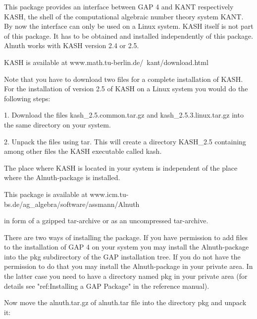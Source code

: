 

This package provides an interface between GAP 4 and KANT respectively
KASH, the shell of the computational algebraic number theory system KANT. By
now the interface can only be used on a Linux system.  KASH itself is not part
of this package.  It has to be obtained and installed independently of this
package. Alnuth works with KASH version 2.4 or 2.5.

 
KASH is available at
\begintt 
            www.math.tu-berlin.de/~kant/download.html
\endtt
 
Note that you have to download two files for a complete installation
of KASH. For the installation of version 2.5 of KASH on a Linux
system you would do the following steps:
\beginlist
\item{1.} Download the files
    kash_2.5.common.tar.gz and kash_2.5.3.linux.tar.gz
    into the same directory on your system.
 
\item{2.} Unpack the files using tar.  This will create a directory
    KASH_2.5 containing among other files the KASH executable called
    kash.

\endlist

The place where KASH is located in your system is independent of the place
 where the Alnuth-package is installed.

 
This package is available at
\begintt 
           www.icm.tu-bs.de/ag_algebra/software/assmann/Alnuth
\endtt 

in form of a gzipped tar-archive or as an uncompressed tar-archive.
 
There are two ways of installing the package.  If you have permission
to add files to the installation of GAP 4 on your system you may
install the Alnuth-package into the pkg subdirectory of the GAP
installation tree.  If you do not have the permission to do that you
may install the Alnuth-package in your private area. In the latter case you
need to have a directory named pkg in your private area (for details see
"ref:Installing a GAP Package" in the reference manual). 

Now move the alnuth.tar.gz of alnuth.tar file into the directory pkg and
unpack it:


